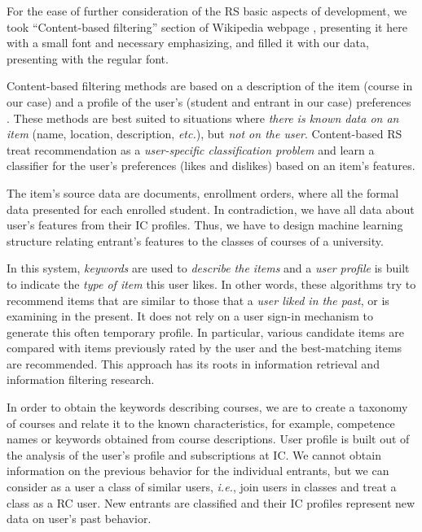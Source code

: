 \documentclass[conference]{IEEEtran}
\begin{document}
For the ease of further consideration of the RS basic aspects of development, we took ``Content-based filtering'' section of Wikipedia webpage \cite{wikiRS}, presenting it here with a small font and necessary emphasizing, and filled it with our data, presenting with the regular font.

{\footnotesize
Content-based filtering methods are based on a description of the item (course in our case) and a profile of the user's (student and entrant in our case) preferences \cite{wb41,wb42}. These methods are best suited to situations where \emph{there is known data on an item} (name, location, description, \emph{etc.}), but \emph{not on the user}. Content-based RS treat recommendation as a \emph{user-specific classification problem} and learn a classifier for the user's preferences (likes and dislikes) based on an item's features.}

The item's source data are documents, enrollment orders, where all the formal data presented for each enrolled student.  In contradiction, we have all data about user's features from their IC profiles.  Thus, we have to design machine learning structure relating entrant's features to the classes of courses of a university.

{\footnotesize
In this system, \emph{keywords} are used to \emph{describe the items} and a \emph{user profile} is built to indicate the \emph{type of item} this user likes. In other words, these algorithms try to recommend items that are similar to those that a \emph{user liked in the past}, or is examining in the present. It does not rely on a user sign-in mechanism to generate this often temporary profile. In particular, various candidate items are compared with items previously rated by the user and the best-matching items are recommended. This approach has its roots in information retrieval and information filtering research.
}

In order to obtain the keywords describing courses, we are to create a taxonomy of courses and relate it to the known characteristics, for example, competence names or keywords obtained from course descriptions.  User profile is built out of the analysis of the user's profile and subscriptions at IC.  We cannot obtain information on the previous behavior for the individual entrants, but we can consider as a user a class of similar users, \emph{i.e.}, join users in classes and treat a class as a RC user.  New entrants are classified and their IC profiles represent new data on user's past behavior.
\end{document}
